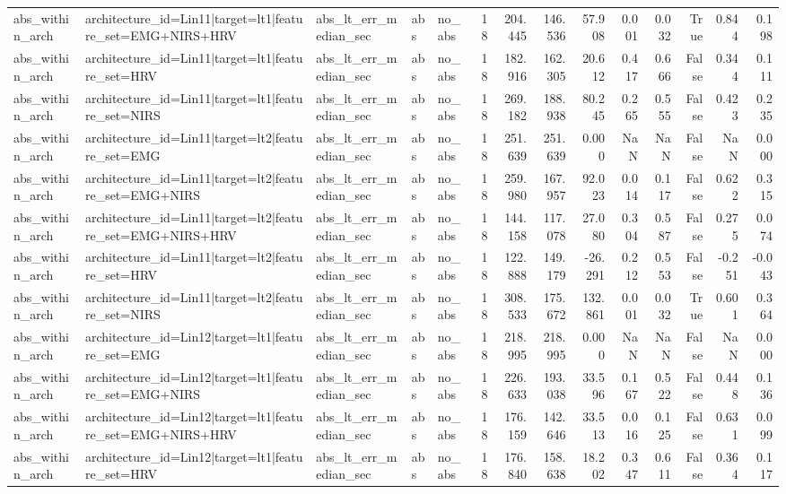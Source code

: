 \begin{table}
\begin{tabular}{lllllrrrrrrrrr}
abs_within_arch & architecture_id=Lin11|target=lt1|feature_set=EMG+NIRS+HRV & abs_lt_err_median_sec & abs & no_abs & 18 & 204.445 & 146.536 & 57.908 & 0.001 & 0.032 & True & 0.844 & 0.198 \\
abs_within_arch & architecture_id=Lin11|target=lt1|feature_set=HRV & abs_lt_err_median_sec & abs & no_abs & 18 & 182.916 & 162.305 & 20.612 & 0.417 & 0.666 & False & 0.344 & 0.111 \\
abs_within_arch & architecture_id=Lin11|target=lt1|feature_set=NIRS & abs_lt_err_median_sec & abs & no_abs & 18 & 269.182 & 188.938 & 80.245 & 0.265 & 0.555 & False & 0.423 & 0.235 \\
abs_within_arch & architecture_id=Lin11|target=lt2|feature_set=EMG & abs_lt_err_median_sec & abs & no_abs & 18 & 251.639 & 251.639 & 0.000 & NaN & NaN & False & NaN & 0.000 \\
abs_within_arch & architecture_id=Lin11|target=lt2|feature_set=EMG+NIRS & abs_lt_err_median_sec & abs & no_abs & 18 & 259.980 & 167.957 & 92.023 & 0.014 & 0.117 & False & 0.622 & 0.315 \\
abs_within_arch & architecture_id=Lin11|target=lt2|feature_set=EMG+NIRS+HRV & abs_lt_err_median_sec & abs & no_abs & 18 & 144.158 & 117.078 & 27.080 & 0.304 & 0.587 & False & 0.275 & 0.074 \\
abs_within_arch & architecture_id=Lin11|target=lt2|feature_set=HRV & abs_lt_err_median_sec & abs & no_abs & 18 & 122.888 & 149.179 & -26.291 & 0.212 & 0.553 & False & -0.251 & -0.043 \\
abs_within_arch & architecture_id=Lin11|target=lt2|feature_set=NIRS & abs_lt_err_median_sec & abs & no_abs & 18 & 308.533 & 175.672 & 132.861 & 0.001 & 0.032 & True & 0.601 & 0.364 \\
abs_within_arch & architecture_id=Lin12|target=lt1|feature_set=EMG & abs_lt_err_median_sec & abs & no_abs & 18 & 218.995 & 218.995 & 0.000 & NaN & NaN & False & NaN & 0.000 \\
abs_within_arch & architecture_id=Lin12|target=lt1|feature_set=EMG+NIRS & abs_lt_err_median_sec & abs & no_abs & 18 & 226.633 & 193.038 & 33.596 & 0.167 & 0.522 & False & 0.448 & 0.136 \\
abs_within_arch & architecture_id=Lin12|target=lt1|feature_set=EMG+NIRS+HRV & abs_lt_err_median_sec & abs & no_abs & 18 & 176.159 & 142.646 & 33.513 & 0.016 & 0.125 & False & 0.631 & 0.099 \\
abs_within_arch & architecture_id=Lin12|target=lt1|feature_set=HRV & abs_lt_err_median_sec & abs & no_abs & 18 & 176.840 & 158.638 & 18.202 & 0.347 & 0.611 & False & 0.364 & 0.117 \\

\end{tabular}
\end{table}
